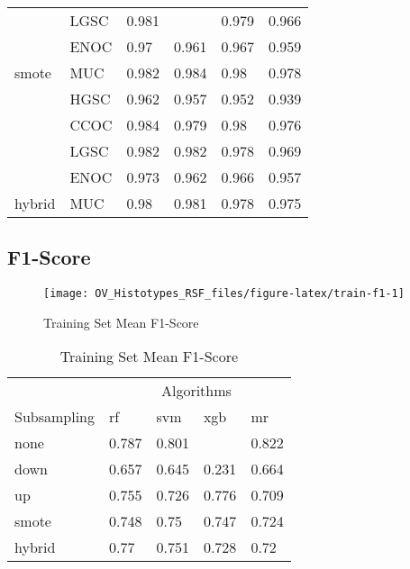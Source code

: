 \documentclass[
]{report}
\begin{document}
\begin{table}
\begin{tabular}[t]{l|l|l|l|l|l}
\cline{2-6}
 & LGSC & 0.981 & \cellcolor[HTML]{90ee90}{0.985} & 0.979 & 0.966\\
\cline{2-6}
 & ENOC & 0.97 & 0.961 & 0.967 & 0.959\\
\cline{2-6}
\multirow{-5}{*}{\raggedright\arraybackslash smote} & MUC & 0.982 & 0.984 & 0.98 & 0.978\\
\cline{1-6}
 & HGSC & 0.962 & 0.957 & 0.952 & 0.939\\
\cline{2-6}
 & CCOC & 0.984 & 0.979 & 0.98 & 0.976\\
\cline{2-6}
 & LGSC & 0.982 & 0.982 & 0.978 & 0.969\\
\cline{2-6}
 & ENOC & 0.973 & 0.962 & 0.966 & 0.957\\
\cline{2-6}
\multirow{-5}{*}{\raggedright\arraybackslash hybrid} & MUC & 0.98 & 0.981 & 0.978 & 0.975\\
\hline
\end{tabular}
\end{table}

\hypertarget{f1-score-1}{%
\subsection{F1-Score}\label{f1-score-1}}

\begin{figure}[H]

{\centering \texttt{[image: OV\_Histotypes\_RSF\_files/figure-latex/train-f1-1]} 

}

\caption{Training Set Mean F1-Score}\label{fig:train-f1}
\end{figure}

\begin{table}

\caption{\label{tab:train-f1-table}Training Set Mean F1-Score}
\centering
\begin{tabular}[t]{l|l|l|l|l}
\hline
\multicolumn{1}{c|}{ } & \multicolumn{4}{c}{Algorithms} \\
\cline{2-5}
Subsampling & rf & svm & xgb & mr\\
\hline
none & 0.787 & 0.801 & \cellcolor[HTML]{90ee90}{0.897} & 0.822\\
\hline
down & 0.657 & 0.645 & 0.231 & 0.664\\
\hline
up & 0.755 & 0.726 & 0.776 & 0.709\\
\hline
smote & 0.748 & 0.75 & 0.747 & 0.724\\
\hline
hybrid & 0.77 & 0.751 & 0.728 & 0.72\\
\hline
\end{tabular}
\end{table}
\end{document}

